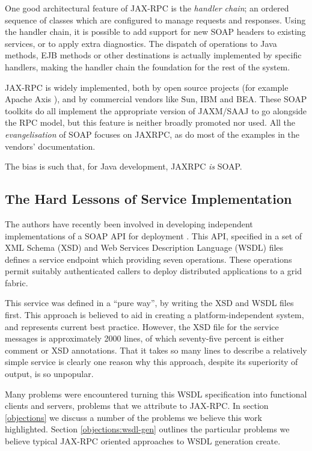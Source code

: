 One good architectural feature of JAX-RPC is the \emph{handler chain};
an ordered sequence of classes which are configured to manage requests
and responses. Using the handler chain, it is possible to add support
for new SOAP headers to existing services, or to apply extra
diagnostics. The dispatch of operations to Java methods, EJB methods
or other destinations is actually implemented by specific handlers,
making the handler chain the foundation for the rest of the system.

JAX-RPC is widely implemented, both by open source projects (for
example Apache Axis \cite{apache:axis}), and by commercial vendors
like Sun, IBM and BEA. These SOAP toolkits do all implement the
appropriate version of JAXM/SAAJ to go alongside the RPC model, but
this feature is neither broadly promoted nor used. All the
\emph{evangelisation} of SOAP focuses on JAXRPC, as do most of the
examples in the vendors' documentation.

The bias is such that, for Java development, JAXRPC \emph{is} SOAP. 

\subsection{The Hard Lessons of Service Implementation}
\label{intro:experience}

The authors have recently been involved in developing independent
implementations of a SOAP API for deployment \cite{draft:CDDLM}. This
API, specified in a set of XML Schema (XSD) \cite{spec:XSD} and Web
Services Description Language (WSDL) files \cite{spec:WSDL-11} defines
a service endpoint which providing seven operations. These operations
permit suitably authenticated callers to deploy distributed
applications to a grid fabric.

This service was defined in a ``pure way'', by writing the XSD and
WSDL files first. This approach is believed to aid in creating a
platform-independent system, and represents current best
practice. However, the XSD file for the service messages is
approximately 2000 lines, of which seventy-five percent is either
comment or XSD annotations. That it takes so many lines to describe a
relatively simple service is clearly one reason why this approach,
despite its superiority of output, is so unpopular.

Many problems were encountered turning this WSDL specification into
functional clients and servers, problems that we attribute to JAX-RPC.
In section \ref{objections} we discuss a number of the problems we
believe this work highlighted. Section \ref{objections:wsdl-gen}
outlines the particular problems we believe typical JAX-RPC oriented
approaches to WSDL generation create.


